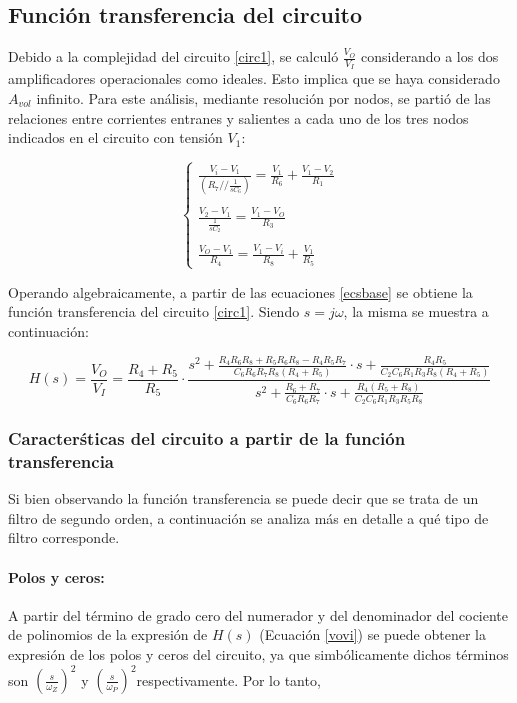 \subsection{Funci\'on transferencia del circuito}
Debido a la complejidad del circuito \ref{circ1}, se  calcul\'o $\frac{V_O}{V_I}$ considerando a los dos amplificadores operacionales como ideales. Esto implica que se haya considerado $A_{vol}$ infinito. Para este an\'alisis, mediante resoluci\'on por nodos, se parti\'o de las relaciones entre corrientes entranes y salientes a cada uno de los tres nodos indicados en el circuito con tensi\'on $V_1$:

\begin{equation}
	\begin{cases}
		\frac{V_i - V_1}{(R_7 // \frac{1}{sC_6})} = \frac{V_1}{R_6} + \frac{V_1 - V_2}{R_1}\\ \\
		\frac{V_2 - V_1}{\frac{1}{sC_2}} = \frac{V_1 - V_O}{R_3}\\ \\
		\frac{V_O - V_1}{R_4} = \frac{V_1 - V_i}{R_8} + \frac{V_1}{R_5}
	\end{cases}
	\label{ecsbase}
\end{equation}

Operando algebraicamente, a partir de las ecuaciones \ref{ecsbase} se obtiene la funci\'on transferencia del circuito \ref{circ1}. Siendo $s = j\omega$, la misma se muestra a continuaci\'on:

\begin{equation}
 	H(s) = \frac{V_O}{V_I} = \frac{R_4 + R_5}{R_5} \cdot 
 	\frac
 	{ s^2
 		+\frac{R_4 R_6 R_8 + R_5 R_6 R_8 - R_4 R_5 R_7}{C_6 R_6 R_7 R_8 (R_4 + R_5)} \cdot s
 		+\frac{R_4 R_5}{C_2 C_6 R_1 R_3 R_8 (R_4 + R_5)}}
 	{s^2
 		+\frac{R_6 + R_7}{C_6 R_6 R_7} \cdot s
 		+\frac{R_4 (R_5 + R_8)}{C_2 C_6 R_1 R_3 R_5 R_8}
 	}
	\label{vovi}
\end{equation}


\subsubsection{Caracter\'sticas del circuito a partir de la funci\'on transferencia}

Si bien observando la funci\'on transferencia se puede decir que se trata de un filtro de segundo orden, a continuaci\'on se analiza m\'as en detalle a qu\'e tipo de filtro corresponde.

\paragraph*{Polos y ceros:}
A partir del t\'ermino de grado cero del numerador y del denominador del cociente de polinomios de la expresi\'on de $H(s)$ (Ecuaci\'on \ref{vovi}) se puede obtener la expresi\'on de los polos y ceros del circuito, ya que simb\'olicamente dichos t\'erminos son $\left(\frac{s}{\omega_Z}\right)^2$ y $\left(\frac{s}{\omega_P}\right)^2$respectivamente. Por lo tanto,

